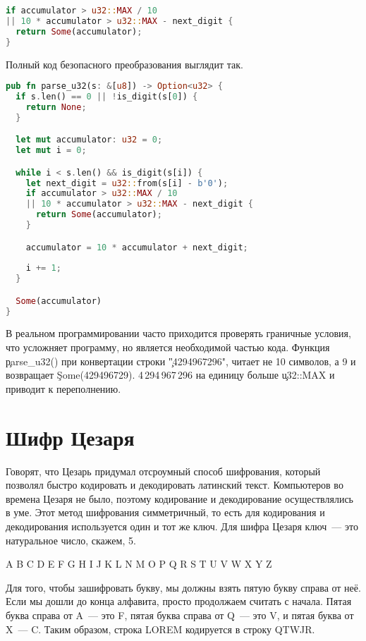 \begin{lstlisting}[language=Rust]
if accumulator > u32::MAX / 10
|| 10 * accumulator > u32::MAX - next_digit {
  return Some(accumulator);
}
\end{lstlisting}

Полный код безопасного преобразования выглядит так.

\begin{lstlisting}[language=Rust]
pub fn parse_u32(s: &[u8]) -> Option<u32> {
  if s.len() == 0 || !is_digit(s[0]) {
    return None;
  }

  let mut accumulator: u32 = 0;
  let mut i = 0;

  while i < s.len() && is_digit(s[i]) {
    let next_digit = u32::from(s[i] - b'0');
    if accumulator > u32::MAX / 10
    || 10 * accumulator > u32::MAX - next_digit {
      return Some(accumulator);
    }

    accumulator = 10 * accumulator + next_digit;
        
    i += 1;
  }

  Some(accumulator)
}
\end{lstlisting}

В реальном программировании часто приходится проверять граничные условия, что усложняет программу, но является необходимой частью кода.
Функция \c{parse\_u32()} при конвертации строки \c{"4294967296"}, читает не 10 символов, а 9 и возвращает \c{Some(429496729)}.
4\,294\,967\,296 на единицу больше \c{u32::MAX} и приводит к переполнению.

\section{Шифр Цезаря}

Говорят, что Цезарь придумал отсроумный способ шифрования, который позволял быстро кодировать и декодировать латинский текст.
Компьютеров во времена Цезаря не было, поэтому кодирование и декодирование осуществлялись в уме.
Этот метод шифрования симметричный, то есть для кодирования и декодирования используется один и тот же ключ.
Для шифра Цезаря ключ~--- это натуральное число, скажем, 5.

A B C D E F G H I J K L N M O P Q R S T U V W X Y Z

Для того, чтобы зашифровать букву, мы должны взять пятую букву справа от неё.
Если мы дошли до конца алфавита, просто продолжаем считать с начала.
Пятая буква справа от A~--- это F, пятая буква справа от Q~--- это V, и пятая буква от X~--- C.
Таким образом, строка LOREM кодируется в строку QTWJR.

